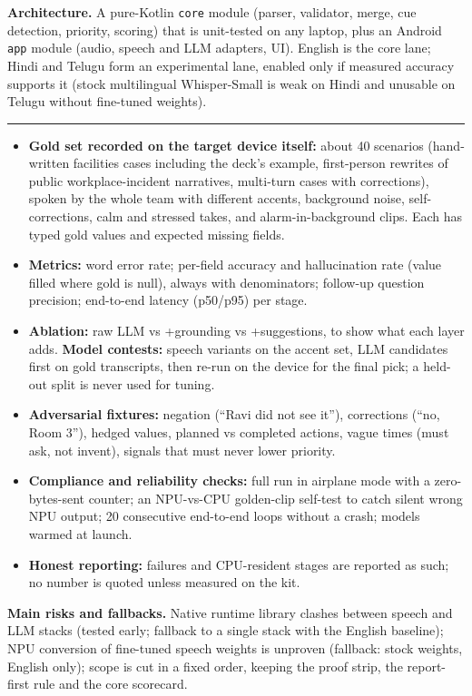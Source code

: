 \documentclass[10pt,a4paper]{article}
\newcommand{\hsec}[1]{\par\vspace{4pt}{\large\bfseries #1}\par\nobreak\vspace{1pt}\hrule\vspace{3pt}}
\begin{document}
\textbf{Architecture.} A pure-Kotlin \texttt{core} module (parser, validator, merge, cue detection, priority, scoring) that is unit-tested on any laptop, plus an Android \texttt{app} module (audio, speech and LLM adapters, UI). English is the core lane; Hindi and Telugu form an experimental lane, enabled only if measured accuracy supports it (stock multilingual Whisper-Small is weak on Hindi and unusable on Telugu without fine-tuned weights).
\hsec{4. Planned testing methodology}
\begin{itemize}\itemsep1pt
\item \textbf{Gold set recorded on the target device itself:} about 40 scenarios (hand-written facilities cases including the deck's example, first-person rewrites of public workplace-incident narratives, multi-turn cases with corrections), spoken by the whole team with different accents, background noise, self-corrections, calm and stressed takes, and alarm-in-background clips. Each has typed gold values and expected missing fields.
\item \textbf{Metrics:} word error rate; per-field accuracy and hallucination rate (value filled where gold is null), always with denominators; follow-up question precision; end-to-end latency (p50/p95) per stage.
\item \textbf{Ablation:} raw LLM vs +grounding vs +suggestions, to show what each layer adds. \textbf{Model contests:} speech variants on the accent set, LLM candidates first on gold transcripts, then re-run on the device for the final pick; a held-out split is never used for tuning.
\item \textbf{Adversarial fixtures:} negation (``Ravi did not see it''), corrections (``no, Room 3''), hedged values, planned vs completed actions, vague times (must ask, not invent), signals that must never lower priority.
\item \textbf{Compliance and reliability checks:} full run in airplane mode with a zero-bytes-sent counter; an NPU-vs-CPU golden-clip self-test to catch silent wrong NPU output; 20 consecutive end-to-end loops without a crash; models warmed at launch.
\item \textbf{Honest reporting:} failures and CPU-resident stages are reported as such; no number is quoted unless measured on the kit.
\end{itemize}
\textbf{Main risks and fallbacks.} Native runtime library clashes between speech and LLM stacks (tested early; fallback to a single stack with the English baseline); NPU conversion of fine-tuned speech weights is unproven (fallback: stock weights, English only); scope is cut in a fixed order, keeping the proof strip, the report-first rule and the core scorecard.
\end{document}
